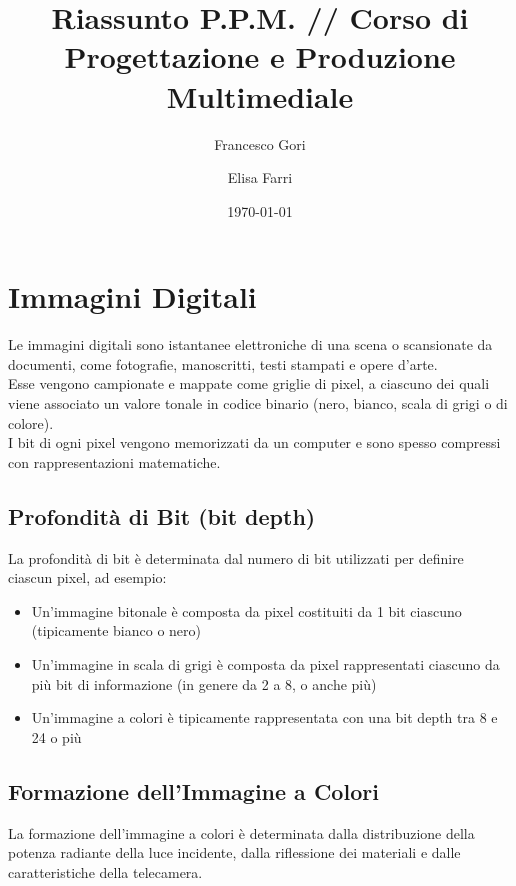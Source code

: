 \documentclass[a4paper,11pt]{article} %
\begin{document}
\title{\textbf{Riassunto P.P.M. // Corso di Progettazione e Produzione Multimediale}}
\author{Francesco Gori \and Elisa Farri}
\date{\today}
\maketitle

\thispagestyle{fancy}
\lhead{}

\tableofcontents

\newpage

\section{Immagini Digitali}
Le immagini digitali sono istantanee elettroniche di una scena o scansionate da documenti, come fotografie, manoscritti, testi stampati e opere d'arte. \\
Esse vengono campionate e mappate come griglie di pixel, a ciascuno dei quali viene associato un valore tonale in codice binario (nero, bianco, scala di grigi o di colore).\\
I bit di ogni pixel vengono memorizzati da un computer e sono spesso compressi con rappresentazioni matematiche.\\

\subsection{Profondità di Bit (bit depth)}
La profondità di bit è determinata dal numero di bit utilizzati per definire ciascun pixel, ad esempio:
\begin{itemize}
\item Un'immagine bitonale è composta da pixel costituiti da 1 bit ciascuno (tipicamente bianco o nero)
\item Un'immagine in scala di grigi è composta da pixel rappresentati ciascuno da più bit di informazione (in genere da 2 a 8, o anche più) 
\item Un'immagine a colori è tipicamente rappresentata con una bit depth tra 8 e 24 o più
\end{itemize}

\subsection{Formazione dell'Immagine a Colori}
La formazione dell'immagine a colori è determinata dalla distribuzione della potenza radiante della luce incidente, dalla riflessione dei materiali e dalle caratteristiche della telecamera.
\end{document}
